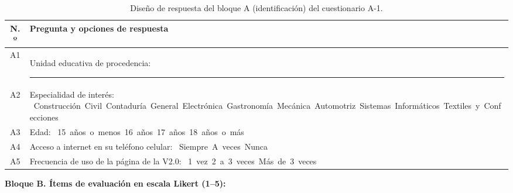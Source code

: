 \begin{table}[H]
    \centering
    \caption{Diseño de respuesta del bloque A (identificación) del cuestionario A-1.}
    \label{tab:a1_identificacion}
    \renewcommand{\arraystretch}{1.60}
    \begin{tabularx}{\textwidth}{c L}
        \toprule
        \textbf{N.º} & \textbf{Pregunta y opciones de respuesta} \\
        \midrule
        A1 & Unidad educativa de procedencia: \rule[-2pt]{4.5cm}{0.4pt} \\
        \addlinespace
        A2 & Especialidad de interés:\newline
            \mbox{\casilla{} Construcción Civil}\quad \mbox{\casilla{} Contaduría General}\quad \mbox{\casilla{} Electrónica}\quad \mbox{\casilla{} Gastronomía}\quad \mbox{\casilla{} Mecánica Automotriz}\quad \mbox{\casilla{} Sistemas Informáticos}\quad \mbox{\casilla{} Textiles y Confecciones} \\
        \addlinespace
        A3 & Edad:\newline
            \mbox{\casilla{} 15 años o menos}\quad \mbox{\casilla{} 16 años}\quad \mbox{\casilla{} 17 años}\quad \mbox{\casilla{} 18 años o más} \\
        \addlinespace
        A4 & Acceso a internet en su teléfono celular:\newline
            \mbox{\casilla{} Siempre}\quad \mbox{\casilla{} A veces}\quad \mbox{\casilla{} Nunca} \\
        \addlinespace
        A5 & Frecuencia de uso de la página de la V2.0:\newline
            \mbox{\casilla{} 1 vez}\quad \mbox{\casilla{} 2 a 3 veces}\quad \mbox{\casilla{} Más de 3 veces} \\
        \bottomrule
    \end{tabularx}
\end{table}

\Needspace{12cm}
\noindent\textbf{Bloque B. Ítems de evaluación en escala Likert (1--5):}

